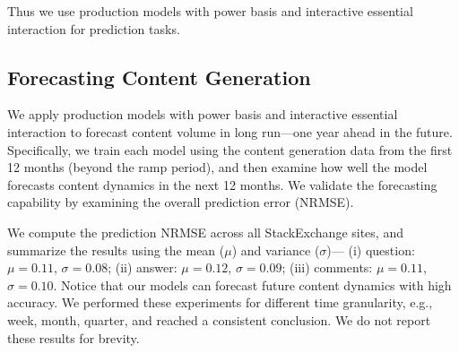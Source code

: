 Thus we use production models with power basis and interactive essential interaction for prediction tasks.

\subsection{Forecasting Content Generation} 
We apply production models with power basis and interactive essential interaction to forecast content volume in long run---one year ahead in the future. Specifically, we train each model using the content generation data from the first 12 months (beyond the ramp period), and then examine how well the model forecasts content dynamics in the next 12 months. We validate the forecasting capability by examining the overall prediction error (NRMSE). 

We compute the prediction NRMSE across all StackExchange sites, and summarize the results using the mean ($\mu$) and variance ($\sigma$)--- (i) question: $\mu = 0.11$, $\sigma = 0.08$; (ii) answer: $\mu = 0.12$, $\sigma = 0.09$; (iii) comments: $\mu = 0.11$, $\sigma = 0.10$. Notice that our models can forecast future content dynamics with high accuracy. We performed these experiments for different time granularity, e.g., week, month, quarter, and reached a consistent conclusion. We do not report these results for brevity.

